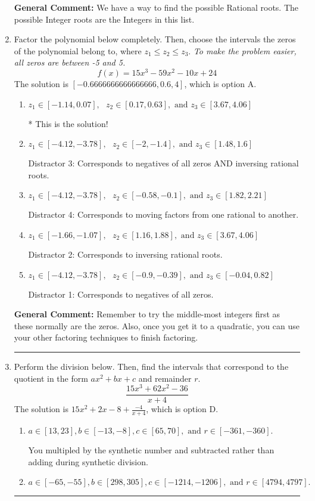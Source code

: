 \documentclass{extbook}[14pt]
\newcommand{\litem}[1]{\item #1

\rule{\textwidth}{0.4pt}}
\begin{document}
\begin{enumerate}
{\textbf{General Comment:} We have a way to find the possible Rational roots. The possible Integer roots are the Integers in this list.
}
\litem{
Factor the polynomial below completely. Then, choose the intervals the zeros of the polynomial belong to, where $z_1 \leq z_2 \leq z_3$. \textit{To make the problem easier, all zeros are between -5 and 5.}
\[ f(x) = 15x^{3} -59 x^{2} -10 x + 24 \]The solution is \( [-0.6666666666666666, 0.6, 4] \), which is option A.\begin{enumerate}[label=\Alph*.]
\item \( z_1 \in [-1.14, 0.07], \text{   }  z_2 \in [0.17, 0.63], \text{   and   } z_3 \in [3.67, 4.06] \)

* This is the solution!
\item \( z_1 \in [-4.12, -3.78], \text{   }  z_2 \in [-2, -1.4], \text{   and   } z_3 \in [1.48, 1.6] \)

 Distractor 3: Corresponds to negatives of all zeros AND inversing rational roots.
\item \( z_1 \in [-4.12, -3.78], \text{   }  z_2 \in [-0.58, -0.1], \text{   and   } z_3 \in [1.82, 2.21] \)

 Distractor 4: Corresponds to moving factors from one rational to another.
\item \( z_1 \in [-1.66, -1.07], \text{   }  z_2 \in [1.16, 1.88], \text{   and   } z_3 \in [3.67, 4.06] \)

 Distractor 2: Corresponds to inversing rational roots.
\item \( z_1 \in [-4.12, -3.78], \text{   }  z_2 \in [-0.9, -0.39], \text{   and   } z_3 \in [-0.04, 0.82] \)

 Distractor 1: Corresponds to negatives of all zeros.
\end{enumerate}

\textbf{General Comment:} Remember to try the middle-most integers first as these normally are the zeros. Also, once you get it to a quadratic, you can use your other factoring techniques to finish factoring.
}
\litem{
Perform the division below. Then, find the intervals that correspond to the quotient in the form $ax^2+bx+c$ and remainder $r$.
\[ \frac{15x^{3} +62 x^{2} -36}{x + 4} \]The solution is \( 15x^{2} +2 x -8 + \frac{-4}{x + 4} \), which is option D.\begin{enumerate}[label=\Alph*.]
\item \( a \in [13, 23], b \in [-13, -8], c \in [65, 70], \text{ and } r \in [-361, -360]. \)

 You multipled by the synthetic number and subtracted rather than adding during synthetic division.
\item \( a \in [-65, -55], b \in [298, 305], c \in [-1214, -1206], \text{ and } r \in [4794, 4797]. \)


\end{enumerate}}
\end{enumerate}
\end{document}
